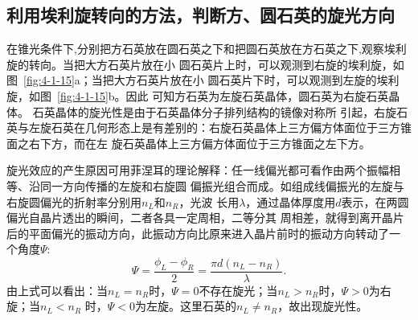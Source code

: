 \documentclass[11pt,a4paper]{article}
\begin{document}
\begin{spacing}{1.3}
\begin{CJK*}{UTF8}{gbsn}
\subsection{利用埃利旋转向的方法，判断方、圆石英的旋光方向}
在锥光条件下,分别把方石英放在圆石英之下和把圆石英放在方石英之下,观察埃利旋的转向。当把大方石英片放在小
圆石英片上时，可以观测到右旋的埃利旋，如图~\ref{fig:4-1-15}a；当把大方石英片放在小
圆石英片下时，可以观测到左旋的埃利旋，如图~\ref{fig:4-1-15}b。因此
可知方石英为左旋石英晶体，圆石英为右旋石英晶体。 石英晶体的旋光性是由于石英晶体分子排列结构的镜像对称所
引起，右旋石英与左旋石英在几何形态上是有差别的：右旋石英晶体上三方偏方体面位于三方锥面之右下方，而在左
旋石英晶体上三方偏方体面位于三方锥面之左下方。\par 
旋光效应的产生原因可用菲涅耳的理论解释：任一线偏光都可看作由两个振幅相等、沿同一方向传播的左旋和右旋圆
偏振光组合而成。如组成线偏振光的左旋与右旋圆偏光的折射率分别用$n_L$和$n_R$，光波
长用$\lambda$，通过晶体厚度用$d$表示，在两圆偏光自晶片透出的瞬间，二者各具一定周相，二等分其
周相差，就得到离开晶片后的平面偏光的振动方向，此振动方向比原来进入晶片前时的振动方向转动了一
个角度$\Psi$:
\begin{equation}
\Psi=\frac{\phi_L-\phi_R}{2}=\frac{\pi d(n_L-n_R)}{\lambda}.
\end{equation}
由上式可以看出：当$n_L=n_R$时，$\Psi=0$不存在旋光；当$n_L>n_R$时，$\Psi>0$为右旋；当$n_L<n_R$
时，$\Psi<0$为左旋。这里石英的$n_L\neq n_R$，故出现旋光性。


\end{CJK*}
\end{spacing}
\end{document}
